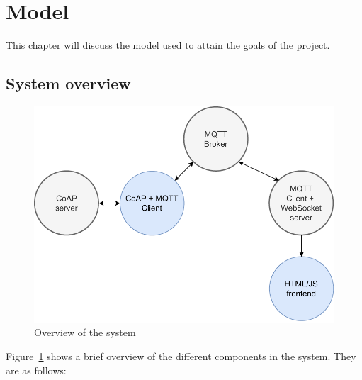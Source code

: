 \section{Model}
\label{ch:method}
\noindent	

This chapter will discuss the model used to attain the goals of the project.

\subsection{System overview}

\begin{figure}[H]
	\begin{center}
		\includegraphics[width=\textwidth]{./doc/system}
		\caption{Overview of the system}
		\label{system-overview}
	\end{center}
\end{figure}

Figure~\ref{system-overview} shows a brief overview of the different components in the system. They are as follows:

